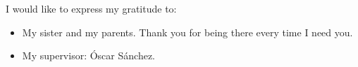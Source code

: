 
\cleardoublepage


\begin{acknowledgements}

I would like to express my gratitude to:
\begin{itemize}
	\item My sister and my parents. Thank you for being there every time I need you.
\end{itemize}

\begin{itemize}
 \item My supervisor: Óscar Sánchez.
 \vspace*{3mm}
\end{itemize}

\end{acknowledgements}

